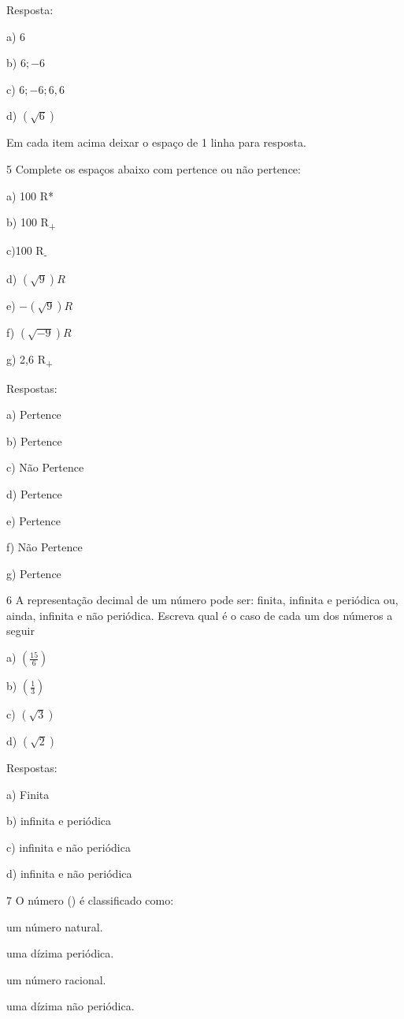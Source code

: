 Resposta:

a) $6$

b) $6; -6$

c) $6; -6; 6,6$

d) $(\sqrt{6})$

Em cada item acima deixar o espaço de 1 linha para resposta.

\num{5} Complete os espaços abaixo com pertence ou não pertence:

a) 100 R*

b) 100 R\textsubscript{+}

c)100 R\textsubscript{-}

d) $(\sqrt{9}) R$

e) $- (\sqrt{9}) R$

f) $(\sqrt{- 9}) R$

g) 2,6 R\textsubscript{+}


Respostas:

a) Pertence

b) Pertence

c) Não Pertence

d) Pertence

e) Pertence

f) Não Pertence

g) Pertence

\num{6} A representação decimal de um número pode ser: finita, infinita e
periódica ou, ainda, infinita e não periódica. Escreva qual é o caso de
cada um dos números a seguir

a) $(\frac{15}{6})$

b) $(\frac{1}{3})$

c) $(\sqrt{3})$

d) $(\sqrt{2})$


Respostas:

a) Finita

b) infinita e periódica

c) infinita e não periódica

d) infinita e não periódica

\num{7} O número (\pi) é classificado como:

\begin{escolha}
\item um número natural.
\item uma dízima periódica.
\item um número racional.
\item uma dízima não periódica.  
\end{escolha} 

